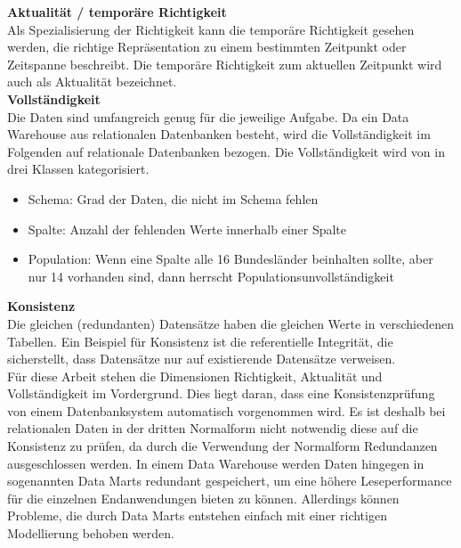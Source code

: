 \textbf{Aktualität / temporäre Richtigkeit} \\
Als Spezialisierung der Richtigkeit kann die temporäre Richtigkeit gesehen werden, die richtige Repräsentation zu einem bestimmten Zeitpunkt oder Zeitspanne beschreibt. 
Die temporäre Richtigkeit zum aktuellen Zeitpunkt wird auch als Aktualität bezeichnet. \\

\textbf{Vollständigkeit} \\
Die Daten sind umfangreich genug für die jeweilige Aufgabe. \cite{wang1996} 
Da ein Data Warehouse aus relationalen Datenbanken besteht, wird die Vollständigkeit im Folgenden auf relationale Datenbanken bezogen.
Die Vollständigkeit wird von \cite{pipino2002} in drei Klassen kategorisiert.
\begin{itemize}
 \item Schema: Grad der Daten, die nicht im Schema fehlen
 \item Spalte: Anzahl der fehlenden Werte innerhalb einer Spalte
 \item Population: Wenn eine Spalte alle 16 Bundesländer beinhalten sollte, aber nur 14 vorhanden sind, dann herrscht Populationsunvollständigkeit \\
\end{itemize} 

\textbf{Konsistenz} \\
Die gleichen (redundanten) Datensätze haben die gleichen Werte in verschiedenen Tabellen. 
Ein Beispiel für Konsistenz ist die referentielle Integrität, die sicherstellt, dass Datensätze nur auf existierende Datensätze verweisen. 
\\ %

Für diese Arbeit stehen die Dimensionen Richtigkeit, Aktualität und Vollständigkeit im Vordergrund. 
Dies liegt daran, dass eine Konsistenzprüfung von einem Datenbanksystem automatisch vorgenommen wird. 
Es ist deshalb bei relationalen Daten in der dritten Normalform nicht notwendig diese auf die Konsistenz zu prüfen, da durch die Verwendung der Normalform Redundanzen ausgeschlossen werden. %
In einem Data Warehouse werden Daten hingegen in sogenannten Data Marts redundant gespeichert, um eine höhere Leseperformance für die einzelnen Endanwendungen bieten zu können. %
Allerdings können Probleme, die durch Data Marts entstehen einfach mit einer richtigen Modellierung behoben werden. \cite{kimball2002}

